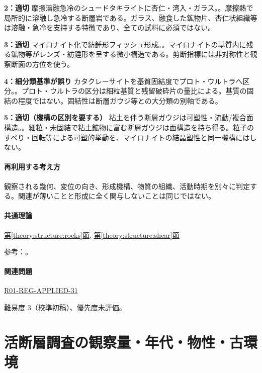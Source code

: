 \noindent\textbf{2：適切} 摩擦溶融急冷のシュードタキライトに杏仁・湾入・ガラス。。摩擦熱で局所的に溶融し急冷する断層岩である。ガラス、融食した鉱物片、杏仁状組織等は溶融・急冷を支持する特徴であり、全ての試料に必須ではない。\par

\noindent\textbf{3：適切} マイロナイト化で紡錘形フィッシュ形成。。マイロナイトの基質内に残る鉱物等がレンズ・紡錘形を呈する微小構造である。剪断指標には非対称性と観察断面の方位を使う。\par

\noindent\textbf{4：細分類基準が誤り} カタクレーサイトを基質固結度でプロト・ウルトラへ区分。。プロト・ウルトラの区分は細粒基質と残留破砕片の量比による。基質の固結の程度ではない。固結性は断層ガウジ等との大分類の別軸である。\par

\noindent\textbf{5：適切（機構の区別を要する）} 粘土を伴う断層ガウジは可塑性・流動/複合面構造。。細粒・未固結で粘土鉱物に富む断層ガウジは面構造を持ち得る。粒子のすべり・回転等による可塑的挙動を、マイロナイトの結晶塑性と同一機構にはしない。\par

\paragraph{再利用する考え方} 観察される幾何、変位の向き、形成機構、物質の組織、活動時期を別々に判定する。関連が薄いことと形成に全く関与しないことは同じではない。

\paragraph{共通理論} \hyperref[theory:structure:rocks]{第\ref*{theory:structure:rocks}節}, \hyperref[theory:structure:shear]{第\ref*{theory:structure:shear}節}

\par 参考：\cite{str_faultrocks,str_shear}。

\paragraph{関連問題} \hyperref[q:r01-reg-applied-31]{R01-REG-APPLIED-31}

\par 難易度 3（校準初稿）、優先度未評価。

\section{活断層調査の観察量・年代・物性・古環境}

